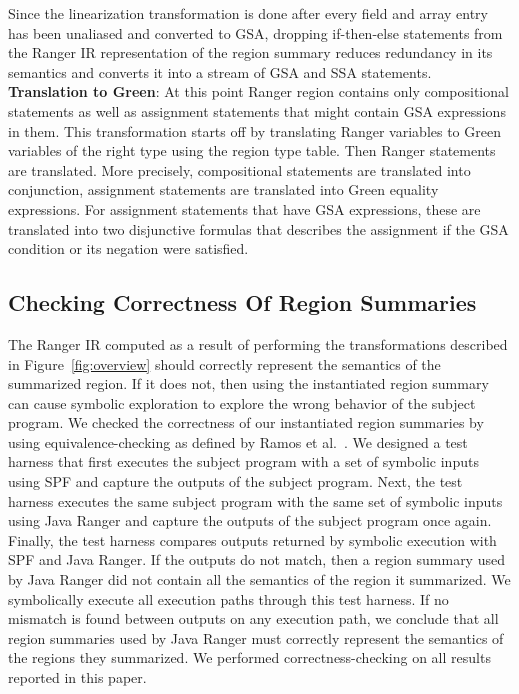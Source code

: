 %
Since the linearization transformation is done after every field and array entry has been unaliased and converted to
GSA, dropping if-then-else statements from the Ranger IR representation of the region summary reduces redundancy in its
semantics and converts it into a stream of GSA and SSA statements.\\
\textbf{Translation to Green}:
%
At this point Ranger region contains only compositional statements as well as assignment statements that might contain GSA expressions in them.
%
This transformation starts off by translating Ranger variables to Green variables of the right type using the region type table.
%
Then Ranger statements are translated. More precisely, compositional statements are translated into conjunction, assignment statements are translated into Green equality expressions.
%
For assignment statements that have GSA expressions, these are translated into two disjunctive formulas that describes the assignment if the GSA condition or its negation were satisfied. 

\subsection{Checking Correctness Of Region Summaries}
The Ranger IR computed as a result of performing the transformations described in Figure~\ref{fig:overview} should
correctly represent the semantics of the summarized region.
%
If it does not, then using the instantiated region summary can cause symbolic exploration to explore the wrong behavior
of the subject program.
%
We checked the correctness of our instantiated region summaries by using equivalence-checking as defined by Ramos et al.~\cite{ramos}.
%
We designed a test harness that first executes the subject program with a set of symbolic inputs using SPF and
capture the outputs of the subject program.
%
Next, the test harness executes the same subject program with the same set of symbolic inputs using Java Ranger and
capture the outputs of the subject program once again.
%
Finally, the test harness compares outputs returned by symbolic execution with SPF and Java Ranger.
%
If the outputs do not match, then a region summary used by Java Ranger did not contain all the semantics
of the region it summarized.
%
We symbolically execute all execution paths through this test harness.
%
If no mismatch is found between outputs on any execution path, we conclude that all region summaries used by Java Ranger
must correctly represent the semantics of the regions they summarized.
%
We performed correctness-checking on all results reported in this paper.
